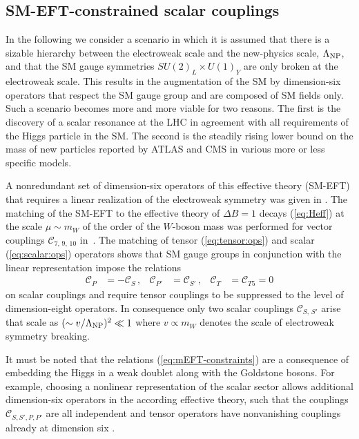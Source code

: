 \documentclass[twocolumn,epjc3]{svjour3}
\numberwithin{equation}{section}
\def \refeq#1{(\ref{#1})}
\newcommand{\wilson}[2][{}]{\mathcal{C}_{#2}^{\mathrm{#1}}}
\renewcommand{\[}{\big[}
\renewcommand{\]}{\big]}
\renewcommand{\(}{\big(}
\renewcommand{\)}{\big)}
\begin{document}
\subsection{SM-EFT-constrained scalar couplings \label{sec:SM-EFT}}

In the following we consider a scenario in which it is assumed that there is
a sizable hierarchy between the electroweak scale and the new-physics
scale, $\Lambda_{\rm NP}$, and that the SM gauge symmetries $SU(2)_L \times
U(1)_Y$ are only broken at the electroweak scale. This results in the
augmentation of the SM by dimension-six operators that respect the SM gauge
group and are composed of SM fields only. Such a scenario becomes more
and more viable for two reasons. The first is the discovery of a
scalar resonance at the LHC in agreement with all requirements of the
Higgs particle in the SM. The second is the steadily rising lower
bound on the mass of new particles reported by ATLAS and CMS in
various more or less specific models.

A nonredundant set of dimension-six operators of this effective theory (SM-EFT)
that requires a linear realization of the electroweak symmetry was given in
\cite{Grzadkowski:2010es}.  The matching of the SM-EFT to the effective theory
of $\Delta B = 1$ decays \refeq{eq:Heff} at the scale $\mu \sim m_W$ of the
order of the $W$-boson mass was performed for vector couplings
$\wilson{7,\,9,\,10}$ in~\cite{D'Ambrosio:2002ex}. The matching of tensor
\refeq{eq:tensor:ops} and scalar \refeq{eq:scalar:ops} operators
\cite{Alonso:2014csa} shows that SM gauge groups in conjunction with the linear
representation impose the relations
\begin{align}
  \label{eq:mEFT-constraints}
  \wilson{P}  & = -\wilson{S}\,, &
  \wilson{P'} & = \wilson{S'}\,, &
  \wilson{T}  & = \wilson{T5} = 0
\end{align}
on scalar couplings and require tensor couplings to be
suppressed to the level of dimension-eight operators. In consequence only two
scalar couplings $\wilson{S,\, S'}$ arise that scale as $(\sim v/\Lambda_{\rm
  NP})^2 \ll 1$ where $v \propto m_W$ denotes the scale of electroweak symmetry breaking.

It must be noted that the relations \refeq{eq:mEFT-constraints} are a
consequence of embedding the Higgs in a weak doublet along with the Goldstone
bosons.  For example, choosing a nonlinear representation of the scalar sector
allows additional dimension-six operators in the according effective theory,
such that the couplings $\wilson{S,S',P,P'}$ are all independent and tensor
operators have nonvanishing couplings already at dimension six
\cite{Cata:2015lta}.
\end{document}
